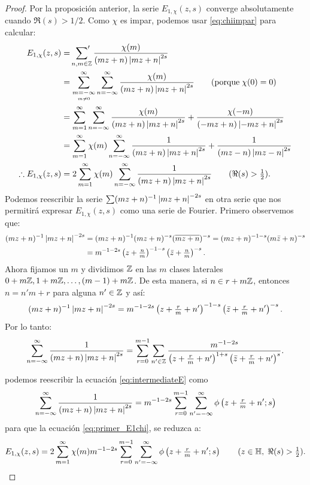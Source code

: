 \documentclass[../../tesis_maestria]{subfiles}
\begin{document}
\begin{proof}
Por la proposici\'on anterior, la serie $E_{1,\chi}(z,s)$ converge absolutamente cuando $\Re(s)>1/2$.
Como $\chi$ es impar, podemos usar \eqref{eq:chiimpar} para calcular:
\begin{align}
  E_{1,\chi}(z,s) & =\sideset{}{'}\sum_{n,m\in\mathbb{Z}}\frac{\chi(m)}{(mz+n)\left| mz+n \right|^{2s}}\nonumber\\
                 & =\sum_{\underset{m\neq0}{m=-\infty}}^{\infty}\sum_{n=-\infty}^{\infty}
                   \frac{\chi(m)}{(mz+n)\left| mz+n \right|^{2s}}\qquad(\text{porque}\;\chi(0)=0)\nonumber\\
                  & =\sum_{m=1}^{\infty}\sum_{n=-\infty}^{\infty}\frac{\chi(m)}{(mz+n)\left| mz+n \right|^{2s}}+
                    \frac{\chi(-m)}{(-mz+n)\left| -mz+n \right|^{2s}}\nonumber\\
                  & =\sum_{m=1}^{\infty}\chi(m)\sum_{n=-\infty}^{\infty}\frac{1}{(mz+n)\left| mz+n \right|^{2s}}+
                    \frac{1}{(mz-n)\left| mz-n \right|^{2s}}\nonumber\\
  \therefore E_{1,\chi}(z,s)& = 2\sum_{m=1}^{\infty}\chi(m)\sum_{n=-\infty}^{\infty}
                    \frac{1}{(mz+n)\left| mz+n \right|^{2s}} \qquad (\Re(s)>\tfrac{1}{2}).\label{eq:primer_E1chi}
\end{align}
Podemos reescribir la serie $\sum(mz+n)^{-1}\left| mz+n \right|^{-2s}$ en otra serie que nos permitir\'a expresar
$E_{1,\chi}(z,s)$ como una serie de Fourier. Primero observemos que:
\begin{align*}
  (mz+n)^{-1}\left| mz+n \right|^{-2s}&=(mz+n)^{-1}(mz+n)^{-s}(\overline{mz+n})^{-s}
                             =(mz+n)^{-1-s}(m\bar{z}+n)^{-s}\\
                            &=m^{-1-2s}\left( z+\tfrac{n}{m} \right)^{-1-s}\left( \bar{z}+\tfrac{n}{m} \right)^{-s}.
\end{align*}
Ahora fijamos un $m$ y dividimos $\mathbb{Z}$ en las $m$ clases laterales $0+m\mathbb{Z},1+m\mathbb{Z},\ldots,(m-1)+m\mathbb{Z}$.
De esta manera, si $n\in r+m\mathbb{Z}$, entonces $n=n'm+r$ para alguna $n'\in\mathbb{Z}$ y as\'i:
\[
  (mz+n)^{-1}\left| mz+n \right|^{-2s}=
  m^{-1-2s}\left( z+\tfrac{r}{m}+n' \right)^{-1-s}\left( \bar{z}+\tfrac{r}{m}+n' \right)^{-s}.
\]
Por lo tanto:
\begin{equation}\label{eq:intermediateE}
\sum_{n=-\infty}^{\infty}\frac{1}{(mz+n)\left| mz+n \right|^{2s}} =
\sum_{r=0}^{m-1}\sum_{n'\in\mathbb{Z}}
\frac{m^{-1-2s}}{\left( z+\tfrac{r}{m}+n' \right)^{1+s}\left( \bar{z}+\tfrac{r}{m}+n' \right)^s}.
\end{equation}


podemos reescribir la ecuaci\'on \eqref{eq:intermediateE} como
\[
  \sum_{n=-\infty}^{\infty}\frac{1}{(mz+n)\left| mz+n \right|^{2s}}=
  m^{-1-2s}\sum_{r=0}^{m-1}\sum_{n'=-\infty}^{\infty}\phi\left( z+\tfrac{r}{m}+n';s \right)
\]
para que la ecuaci\'on \eqref{eq:primer_E1chi}, se reduzca a:
\begin{equation*}
  E_{1,\chi}(z,s)=
  2\sum_{m=1}^{\infty}\chi(m)m^{-1-2s}\sum_{r=0}^{m-1}
  \sum_{n'=-\infty}^{\infty}\phi\left( z+\tfrac{r}{m}+n';s \right)\qquad(z\in\mathbb{H},\;\Re(s)>\tfrac{1}{2}).
\end{equation*}
\end{proof}
\end{document}

